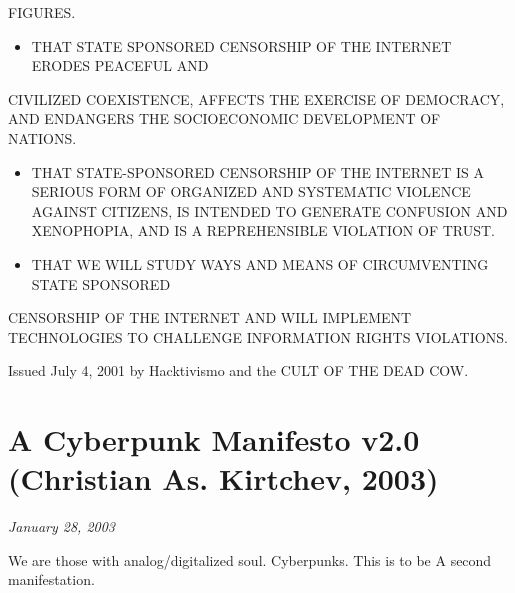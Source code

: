 \documentclass[letterpaper,12pt,english]{sphinxmanual}
\begin{document}
FIGURES.
\begin{itemize}
\item {} 
THAT STATE SPONSORED CENSORSHIP OF THE INTERNET ERODES PEACEFUL AND

\end{itemize}

CIVILIZED COEXISTENCE, AFFECTS THE EXERCISE OF DEMOCRACY, AND ENDANGERS
THE SOCIOECONOMIC DEVELOPMENT OF NATIONS.
\begin{itemize}
\item {} 
THAT STATE-SPONSORED CENSORSHIP OF THE INTERNET IS A SERIOUS FORM OF ORGANIZED AND SYSTEMATIC VIOLENCE AGAINST CITIZENS, IS INTENDED TO GENERATE CONFUSION AND XENOPHOPIA, AND IS A REPREHENSIBLE VIOLATION OF TRUST.

\item {} 
THAT WE WILL STUDY WAYS AND MEANS OF CIRCUMVENTING STATE SPONSORED

\end{itemize}

CENSORSHIP OF THE INTERNET AND WILL IMPLEMENT TECHNOLOGIES TO CHALLENGE
INFORMATION RIGHTS VIOLATIONS.

Issued July 4, 2001 by Hacktivismo and the CULT OF THE DEAD COW.


\chapter{A Cyberpunk Manifesto v2.0 (Christian As. Kirtchev, 2003)}
\label{2003::doc}\label{2003:a-cyberpunk-manifesto-v2-0-christian-as-kirtchev-2003}\label{2003:index-0}
\emph{January 28, 2003}

We are those with analog/digitalized soul. Cyberpunks. This is to be A second manifestation.
\end{document}

